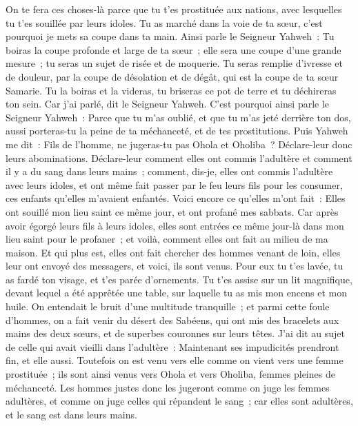 \begin{multicols}{2}
On te fera ces choses-là parce que tu t'es prostituée aux nations, avec lesquelles tu t'es souillée par leurs idoles.
Tu as marché dans la voie de ta sœur, c'est pourquoi je mets sa coupe dans ta main.
Ainsi parle le Seigneur Yahweh~: Tu boiras la coupe profonde et large de ta sœur~; elle sera une coupe d'une grande mesure~; tu seras un sujet de risée et de moquerie.
Tu seras remplie d'ivresse et de douleur, par la coupe de désolation et de dégât, qui est la coupe de ta sœur Samarie.
Tu la boiras et la videras, tu briseras ce pot de terre et tu déchireras ton sein. Car j'ai parlé, dit le Seigneur Yahweh.
C'est pourquoi ainsi parle le Seigneur Yahweh~: Parce que tu m'as oublié, et que tu m'as jeté derrière ton dos, aussi porteras-tu la peine de ta méchanceté, et de tes prostitutions.
Puis Yahweh me dit~: Fils de l'homme, ne jugeras-tu pas Ohola et Oholiba~? Déclare-leur donc leurs abominations.
Déclare-leur comment elles ont commis l'adultère et comment il y a du sang dans leurs mains~; comment, dis-je, elles ont commis l'adultère avec leurs idoles, et ont même fait passer par le feu leurs fils pour les consumer, ces enfants qu'elles m'avaient enfantés.
Voici encore ce qu'elles m'ont fait~: Elles ont souillé mon lieu saint ce même jour, et ont profané mes sabbats.
Car après avoir égorgé leurs fils à leurs idoles, elles sont entrées ce même jour-là dans mon lieu saint pour le profaner~; et voilà, comment elles ont fait au milieu de ma maison.
Et qui plus est, elles ont fait chercher des hommes venant de loin, elles leur ont envoyé des messagers, et voici, ils sont venus. Pour eux tu t'es lavée, tu as fardé ton visage, et t'es parée d'ornements.
Tu t'es assise sur un lit magnifique, devant lequel a été apprêtée une table, sur laquelle tu as mis mon encens et mon huile.
On entendait le bruit d'une multitude tranquille~; et parmi cette foule d'hommes, on a fait venir du désert des Sabéens, qui ont mis des bracelets aux mains des deux sœurs, et de superbes couronnes sur leurs têtes.
J'ai dit au sujet de celle qui avait vieilli dans l'adultère~: Maintenant ses impudicités prendront fin, et elle aussi.
Toutefois on est venu vers elle comme on vient vers une femme prostituée~; ils sont ainsi venus vers Ohola et vers Oholiba, femmes pleines de méchanceté.
Les hommes justes donc les jugeront comme on juge les femmes adultères, et comme on juge celles qui répandent le sang~; car elles sont adultères, et le sang est dans leurs mains.

\end{multicols}
